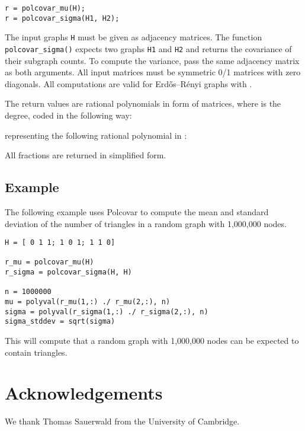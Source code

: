 \documentclass{article}
\begin{document}
\begin{verbatim}
r = polcovar_mu(H);
r = polcovar_sigma(H1, H2);
\end{verbatim}

The input graphs \texttt{H} must be given as  adjacency matrices.
The function \texttt{polcovar\_sigma()} expects two graphs \texttt{H1} and
\texttt{H2} and returns the covariance of their subgraph counts.  To compute
the variance, pass the same adjacency matrix as both arguments.  All
input matrices must be symmetric 0/1 matrices with zero diagonals. 
All computations are valid for Erdős--Rényi graphs with . 

The return values are rational polynomials in form of 
matrices, where  is the degree, coded in the following way:

representing the following rational polynomial in :

All fractions  are returned in simplified form. 

\subsection{Example}
The following example uses Polcovar to compute the mean and standard
deviation of the number of triangles in a random graph with 1,000,000
nodes.

\begin{verbatim}
H = [ 0 1 1; 1 0 1; 1 1 0]

r_mu = polcovar_mu(H)
r_sigma = polcovar_sigma(H, H)

n = 1000000
mu = polyval(r_mu(1,:) ./ r_mu(2,:), n)
sigma = polyval(r_sigma(1,:) ./ r_sigma(2,:), n)
sigma_stddev = sqrt(sigma)
\end{verbatim}
This will compute that a random graph with 1,000,000 nodes can be
expected to contain 
triangles.   

\section*{Acknowledgements}
We thank Thomas Sauerwald from the University of Cambridge. 



\end{document}
